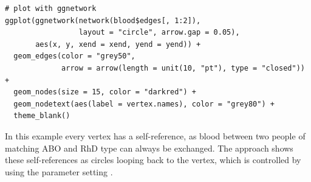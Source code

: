 \begin{knitrout}
\color{fgcolor}\begin{kframe}
\begin{verbatim}
# plot with ggnetwork
ggplot(ggnetwork(network(blood$edges[, 1:2]),
                 layout = "circle", arrow.gap = 0.05),
       aes(x, y, xend = xend, yend = yend)) +
  geom_edges(color = "grey50",
             arrow = arrow(length = unit(10, "pt"), type = "closed")) +
  geom_nodes(size = 15, color = "darkred") +
  geom_nodetext(aes(label = vertex.names), color = "grey80") +
  theme_blank()
\end{verbatim}
\end{kframe}
\end{knitrout}

In this example every vertex has a self-reference, as blood between two people of matching ABO and RhD type can always be exchanged.  The  approach shows these self-references as circles looping back to the vertex, which is controlled by using the parameter setting .


